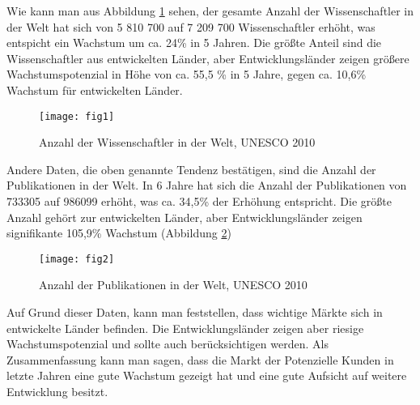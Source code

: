 Wie kann man aus Abbildung \ref{fig:fig1} sehen, der gesamte Anzahl der Wissenschaftler in der Welt hat sich von 5 810 700 auf 7 209 700 Wissenschaftler erhöht, was entspicht ein Wachstum um ca. 24\% in 5 Jahren. Die größte Anteil sind die Wissenschaftler aus entwickelten Länder, aber Entwicklungsländer zeigen größere Wachstumspotenzial in Höhe von ca. 55,5 \% in 5 Jahre, gegen ca. 10,6\% Wachstum für entwickelten Länder.\\
\begin{figure}[h!]
\centering
\texttt{[image: fig1]}
\caption{Anzahl der Wissenschaftler in der Welt, UNESCO 2010}
\label{fig:fig1}
\end{figure}
Andere Daten, die oben genannte Tendenz bestätigen, sind die Anzahl der Publikationen in der Welt. In 6 Jahre hat sich die Anzahl der Publikationen von 733305 auf 986099 erhöht, was ca. 34,5\% der Erhöhung entspricht. Die größte Anzahl gehört zur entwickelten Länder, aber Entwicklungsländer zeigen signifikante 105,9\% Wachstum (Abbildung \ref{fig:fig2})\\
\begin{figure}[h!]
\centering
\texttt{[image: fig2]}
\caption{Anzahl der Publikationen in der Welt, UNESCO 2010}
\label{fig:fig2}
\end{figure}
Auf Grund dieser Daten, kann man feststellen, dass  wichtige Märkte sich in entwickelte Länder befinden. Die Entwicklungsländer zeigen aber riesige Wachstumspotenzial und sollte auch berücksichtigen werden. 
Als Zusammenfassung kann man sagen, dass die Markt der Potenzielle Kunden in letzte Jahren eine gute Wachstum gezeigt hat und eine gute Aufsicht auf weitere Entwicklung besitzt.


